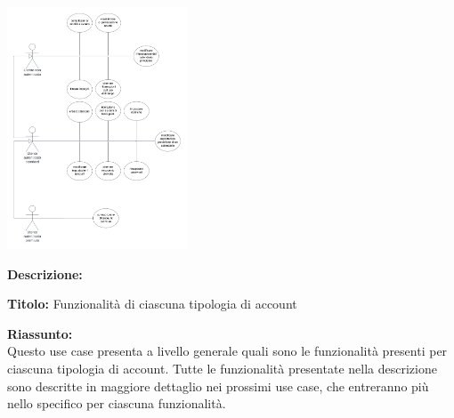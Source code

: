 \begin{listaPersonale}[UC]{}
    \begin{center}
        \includegraphics[width=0.4\textwidth]{img/Diagrammi/UseCases/FunzionalitaUtenti.png}
    \end{center}

    \textbf{Descrizione:}

    \textbf{Titolo:} Funzionalità di ciascuna tipologia di account

    \textbf{Riassunto:} \\
    Questo use case presenta a livello generale quali sono le funzionalità presenti per ciascuna tipologia di account. Tutte le funzionalità presentate nella descrizione sono descritte in maggiore dettaglio nei prossimi use case, che entreranno più nello specifico per ciascuna funzionalità.


\end{listaPersonale}
